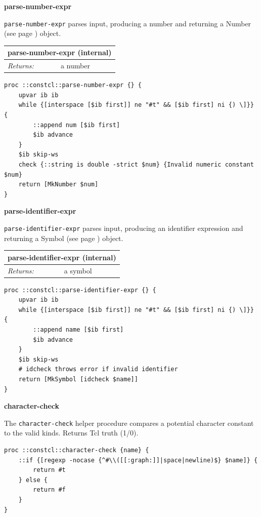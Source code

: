 \documentclass[twoside,9pt]{report}
\begin{document}
\textbf{parse-number-expr}


\texttt{parse-number-expr} parses input, producing a number and returning a Number (see page \pageref{numbers}) object.

\begin{tabular}{ |l l| }
\hline
\multicolumn{2}{|l|}{parse-number-expr (internal)} \\
\hline
\textit{Returns:} & a number \\
\hline
\end{tabular}

\noindent\makebox[\linewidth]{\rule{\linewidth}{0.4pt}}
\begin{lstlisting}
proc ::constcl::parse-number-expr {} {
    upvar ib ib
    while {[interspace [$ib first]] ne "#t" && [$ib first] ni {) \]}} {
        ::append num [$ib first]
        $ib advance
    }
    $ib skip-ws
    check {::string is double -strict $num} {Invalid numeric constant $num}
    return [MkNumber $num]
}
\end{lstlisting}
\noindent\makebox[\linewidth]{\rule{\linewidth}{0.4pt}}

\textbf{parse-identifier-expr}


\texttt{parse-identifier-expr} parses input, producing an identifier expression and returning a Symbol (see page \pageref{symbols}) object.

\begin{tabular}{ |l l| }
\hline
\multicolumn{2}{|l|}{parse-identifier-expr (internal)} \\
\hline
\textit{Returns:} & a symbol \\
\hline
\end{tabular}

\noindent\makebox[\linewidth]{\rule{\linewidth}{0.4pt}}
\begin{lstlisting}
proc ::constcl::parse-identifier-expr {} {
    upvar ib ib
    while {[interspace [$ib first]] ne "#t" && [$ib first] ni {) \]}} {
        ::append name [$ib first]
        $ib advance
    }
    $ib skip-ws
    # idcheck throws error if invalid identifier
    return [MkSymbol [idcheck $name]]
}
\end{lstlisting}
\noindent\makebox[\linewidth]{\rule{\linewidth}{0.4pt}}

\textbf{character-check}


The \texttt{character-check} helper procedure compares a potential
character constant to the valid kinds. Returns Tcl truth (1/0).

\noindent\makebox[\linewidth]{\rule{\linewidth}{0.4pt}}
\begin{lstlisting}
proc ::constcl::character-check {name} {
    ::if {[regexp -nocase {^#\\([[:graph:]]|space|newline)$} $name]} {
        return #t
    } else {
        return #f
    }
}
\end{lstlisting}
\noindent\makebox[\linewidth]{\rule{\linewidth}{0.4pt}}
\end{document}
